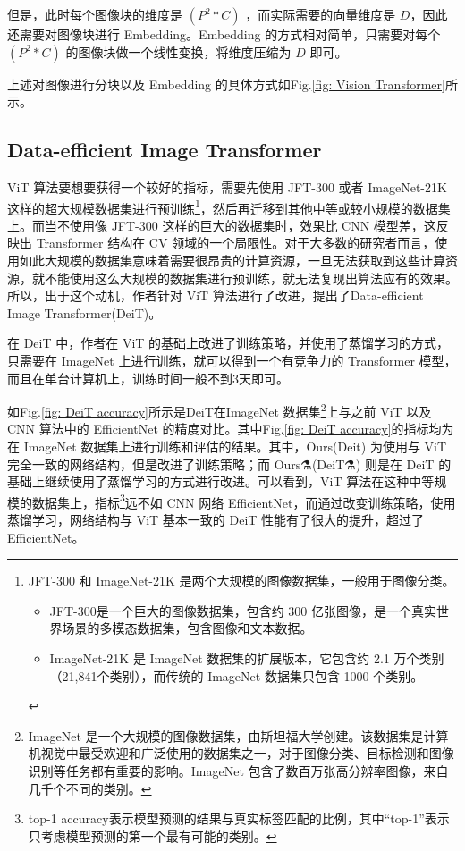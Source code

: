\documentclass[letterpaper,10pt]{article}
\begin{document}
	但是，此时每个图像块的维度是 $\left(P^2 * C\right)$ ，而实际需要的向量维度是 $D$，因此还需要对图像块进行 Embedding。Embedding 的方式相对简单，只需要对每个 $\left(P^2 * C\right)$ 的图像块做一个线性变换，将维度压缩为 $D$ 即可。
	
	上述对图像进行分块以及 Embedding 的具体方式如Fig.\ref{fig: Vision Transformer}所示。
	
	\subsection{Data-efficient Image Transformer\cite{touvron2021training}}
	
	ViT 算法要想要获得一个较好的指标，需要先使用 JFT-300 或者 ImageNet-21K 这样的超大规模数据集进行预训练\footnote{JFT-300 和 ImageNet-21K 是两个大规模的图像数据集，一般用于图像分类。
	\begin{itemize}
		\item {}
		JFT-300是一个巨大的图像数据集，包含约 300 亿张图像，是一个真实世界场景的多模态数据集，包含图像和文本数据。
		\item {}
		ImageNet-21K 是 ImageNet 数据集的扩展版本，它包含约 2.1 万个类别（21,841个类别），而传统的 ImageNet 数据集只包含 1000 个类别。
	\end{itemize}
	}，然后再迁移到其他中等或较小规模的数据集上。而当不使用像 JFT-300 这样的巨大的数据集时，效果比 CNN 模型差，这反映出 Transformer 结构在 CV 领域的一个局限性。对于大多数的研究者而言，使用如此大规模的数据集意味着需要很昂贵的计算资源，一旦无法获取到这些计算资源，就不能使用这么大规模的数据集进行预训练，就无法复现出算法应有的效果。所以，出于这个动机，作者针对 ViT 算法进行了改进，提出了Data-efficient Image Transformer(DeiT)。
	
	在 DeiT 中，作者在 ViT 的基础上改进了训练策略，并使用了蒸馏学习的方式，只需要在 ImageNet 上进行训练，就可以得到一个有竞争力的 Transformer 模型，而且在单台计算机上，训练时间一般不到3天即可。
	
	如Fig.\ref{fig: DeiT accuracy}所示是DeiT在ImageNet 数据集\footnote{ImageNet 是一个大规模的图像数据集，由斯坦福大学创建。该数据集是计算机视觉中最受欢迎和广泛使用的数据集之一，对于图像分类、目标检测和图像识别等任务都有重要的影响。ImageNet 包含了数百万张高分辨率图像，来自几千个不同的类别。}上与之前 ViT 以及 CNN 算法中的 EfficientNet 的精度对比。其中Fig.\ref{fig: DeiT accuracy}的指标均为在 ImageNet 数据集上进行训练和评估的结果。其中，Ours(Deit) 为使用与 ViT 完全一致的网络结构，但是改进了训练策略；而 Ours⚗(DeiT⚗) 则是在 DeiT 的基础上继续使用了蒸馏学习的方式进行改进。可以看到，ViT 算法在这种中等规模的数据集上，指标\footnote{top-1 accuracy表示模型预测的结果与真实标签匹配的比例，其中“top-1”表示只考虑模型预测的第一个最有可能的类别。}远不如 CNN 网络 EfficientNet，而通过改变训练策略，使用蒸馏学习，网络结构与 ViT 基本一致的 DeiT 性能有了很大的提升，超过了 EfficientNet。
	
\end{document}
